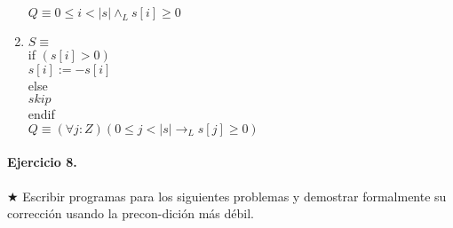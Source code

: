 \documentclass{article}
\begin{document}
\begin{enumerate}[label=\alph*)]
   $Q \equiv 0 \leq i < |s| \wedge_L s[i] \geq 0$\\
\item $S \equiv$\\
   if $( s [ i ] > 0 )$\\
      $s [ i ] := -s [ i ]$\\
   else\\
      $skip$\\
   endif\\

   $Q \equiv (\forall j :Z)(0 \leq j < |s| \rightarrow_L s[j] \geq 0)$
\end{enumerate}
                                                          
\paragraph{Ejercicio 8.} $\bigstar$ Escribir programas para los siguientes problemas y demostrar 
formalmente su corrección usando la precon-dición más débil.
\end{document}
